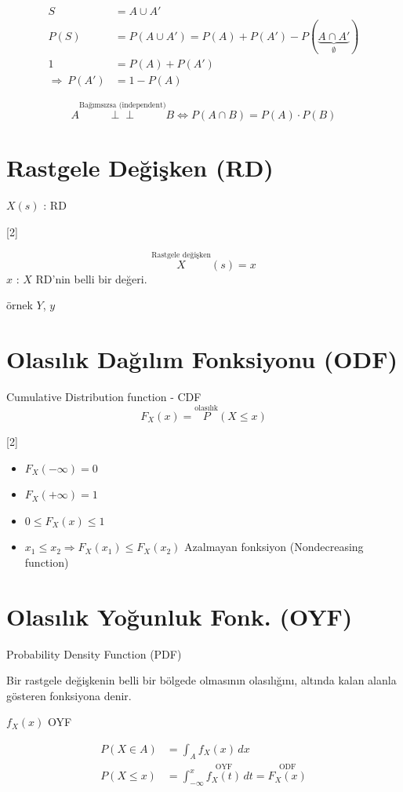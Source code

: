 \documentclass[11pt,a4paper]{article}
\begin{document}
\begin{align*}
S &= A\cup A'\\
P(S) &= P(A\cup A') = P(A)+P(A')-P(\underbrace{A\cap A'}_{\emptyset})\\
1 &= P(A)+P(A')\\
\Rightarrow\ P(A') &= 1-P(A)
\end{align*}

\[ A \overset{\text{Bağımsızsa (independent)}}{\perp\!\!\!\perp} B \iff P(A\cap B)=P(A)\cdot P(B) \]

\section{Rastgele Değişken (RD)}
$X(s)$ : RD

[2]

\[ \overset{\text{Rastgele değişken}}{X}(s)=x \]
$x$ : $X$ RD'nin belli bir değeri.

örnek $Y$, $y$

\section{Olasılık Dağılım Fonksiyonu (ODF)}
Cumulative Distribution function - CDF
\[ F_X(x)=\overset{\text{olasılık}}{P}(X\le x) \]

[2]

\begin{itemize}
\item $F_X(-\infty)=0$
\item $F_X(+\infty)=1$
\item $0\le F_X(x)\le 1$
\item $x_1\le x_2 \Rightarrow F_X(x_1)\le F_X(x_2)$ \hfill Azalmayan fonksiyon (Nondecreasing function)
\end{itemize}

\section{Olasılık Yoğunluk Fonk. (OYF)}
Probability Density Function (PDF)

Bir rastgele değişkenin belli bir bölgede olmasının olasılığını, altında kalan alanla gösteren fonksiyona denir.

$f_X(x)$ OYF

\begin{align*}
P(X\in A) &= \int_{A} f_X(x)\,dx\\
P(X\le x) &= \int_{-\infty}^{x} \overset{\text{OYF}}{f_X(t)}\,dt = \overset{\text{ODF}}{F_X(x)}
\end{align*}
\end{document}

